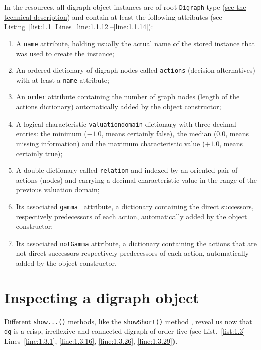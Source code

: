 In the \Digraph resources, all digraph object instances are of root \texttt{Digraph} type (\href{https://digraph3.readthedocs.io/en/latest/techDoc.html#organisation-of-the-digraph3-modules}{see the technical description}) and contain at least the following attributes (see Listing~\vref{list:1.1}  Lines~\ref{line:1.1.12}--\ref{line:1.1.14}):
\begin{enumerate}[leftmargin=0.5cm,listparindent=0em,nosep]
\item A \texttt{name} attribute, holding usually the actual name of the stored instance that was used to create the instance;
\item An ordered dictionary of digraph nodes called \texttt{actions} (decision alternatives) with at least a \texttt{name} attribute;
\item An \texttt{order} attribute containing the number of graph nodes (length of the actions dictionary) automatically added by the object constructor;
\item  A logical characteristic \texttt{valuationdomain} dictionary with three decimal entries: the minimum ($-1.0$, means certainly false), the median ($0.0$, means missing information) and the maximum characteristic value ($+1.0$, means certainly true);
\item A double dictionary called \texttt{relation} and indexed by an oriented pair of actions (nodes) and carrying a decimal characteristic value in the range of the previous valuation domain;
\item Its associated \texttt{gamma } attribute, a dictionary containing the direct successors, respectively predecessors of each action, automatically added by the object constructor;
\item Its associated \texttt{notGamma} attribute, a dictionary containing the actions that are not direct successors respectively predecessors of each action, automatically added by the object constructor.
\end{enumerate}

\section{Inspecting a digraph object}
\label{sec:1.4}

Different \texttt{show...()} methods, like the \texttt{showShort()} method , reveal us now that \texttt{dg} is a crisp, irreflexive and connected digraph of order five (see List.~\vref{list:1.3}  Lines~\ref{line:1.3.1}, \ref{line:1.3.16}, \ref{line:1.3.26}, \ref{line:1.3.29}).

